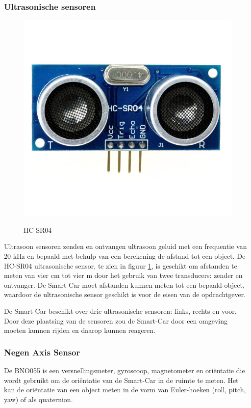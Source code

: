 \subsubsection{Ultrasonische sensoren}
\begin{figure}[h]
    \centering
    \includegraphics[scale = 0.2]{Media/Figuren/HCSR04-hardware.jpg}
    \caption{HC-SR04}
    \label{HC-SR04-component}
    \cite{HC-SR04-image-RL} 
\end{figure}
Ultrasoon sensoren zenden en ontvangen ultrasoon geluid met een frequentie van 20 kHz en bepaald met behulp van een berekening de afstand tot een object. De HC-SR04 ultrasonische sensor, te zien in figuur \ref{HC-SR04-component}\cite{HC-SR04-image-RL}, is geschikt om afstanden te meten van vier cm tot vier m door het gebruik van twee \gls{transducer}s: zender en ontvanger. De \gls{Smart-Car} moet afstanden kunnen meten tot een bepaald object, waardoor de ultrasonische sensor geschikt is voor de eisen van de opdrachtgever\cite{HC-SR04}.

De \gls{Smart-Car} beschikt over drie ultrasonische sensoren: links, rechts en voor. Door deze plaatsing van de sensoren zou de \gls{Smart-Car} door een omgeving moeten kunnen rijden en daarop kunnen reageren. 

\subsubsection{Negen Axis Sensor}
De BNO055\cite{AXIS} is een versnellingsmeter, gyroscoop, magnetometer en oriëntatie die wordt gebruikt om de oriëntatie van de \gls{Smart-Car} in de ruimte te meten. Het kan de oriëntatie van een object meten in de vorm van Euler-hoeken (roll, pitch, yaw) of als quaternion.

